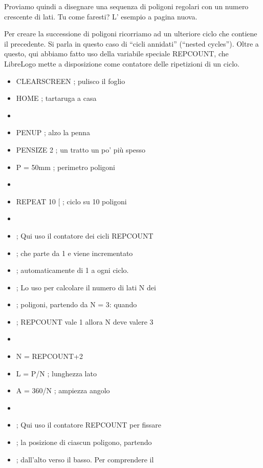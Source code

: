 Proviamo quindi a disegnare una sequenza di poligoni regolari con un numero crescente di lati. Tu come faresti? L' esempio a pagina nuova.

\pagebreak

\begin{scriptsize}
\begin{minipage}{0.60\textwidth}
Per creare la successione di poligoni ricorriamo ad un ulteriore ciclo che contiene il precedente. Si parla in questo caso di “cicli annidati” (“nested cycles”). Oltre a questo, qui abbiamo fatto uso della variabile speciale REPCOUNT, che LibreLogo mette a disposizione come contatore delle ripetizioni di un ciclo.
\begin{itemize}[itemsep=-3pt,parsep=2pt]
\item[] CLEARSCREEN	; pulisco il foglio                            
\item[] HOME			; tartaruga a casa
\item[] 
\item[] PENUP		; alzo la penna
\item[] PENSIZE 2		; un tratto un po' più spesso
\item[] P = 50mm		; perimetro poligoni
\item[]                                                                  
\item[] REPEAT 10 [		; ciclo su 10 poligoni
\item[] 
\item[] ; Qui uso il  contatore dei cicli REPCOUNT
\item[] ; che parte da 1 e viene incrementato 
\item[] ; automaticamente di 1 a ogni ciclo.
\item[] ; Lo uso per calcolare il numero di lati N dei                   
\item[] ; poligoni, partendo da N = 3: quando
\item[] ; REPCOUNT vale 1 allora N deve valere 3
\item[] 
\item[] 	N = REPCOUNT+2
\item[] 	L = P/N	; lunghezza lato
\item[] 	A = 360/N	; ampiezza angolo                       
\item[] 
\item[] ; Qui uso il contatore REPCOUNT per fissare
\item[] ; la posizione di ciascun poligono, partendo
\item[] ; dall'alto verso il basso. Per comprendere il 

\end{itemize}
\end{minipage}
\end{scriptsize}
